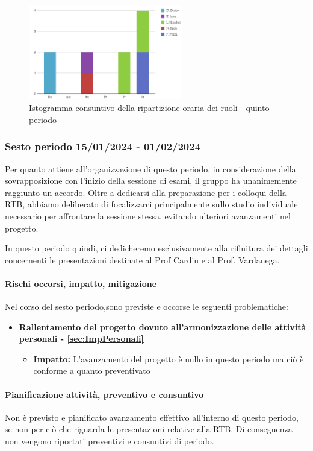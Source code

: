 \begin{figure}[H]
    \centering
    \includegraphics[width=0.6\textwidth]{../Images/consuntivoDivisioneRuoli5Periodo.png}
    \caption{Istogramma consuntivo della ripartizione oraria dei ruoli - quinto periodo}
    \label{fig:Consuntivo_ripartizione_oraria_4}
\end{figure}


\subsubsection{Sesto periodo  15/01/2024 - 01/02/2024}
Per quanto attiene all'organizzazione di questo periodo, in considerazione della sovrapposizione con l'inizio della sessione di esami, il gruppo ha unanimemente raggiunto un accordo. Oltre a dedicarsi alla preparazione per i colloqui della RTB, abbiamo deliberato di focalizzarci principalmente sullo studio individuale necessario per affrontare la sessione stessa, evitando ulteriori avanzamenti nel progetto.

In questo periodo quindi, ci dedicheremo esclusivamente alla rifinitura dei dettagli concernenti le presentazioni destinate al Prof Cardin e al Prof. Vardanega.

\paragraph{Rischi occorsi, impatto, mitigazione} 
Nel corso del sesto periodo,sono previste e occorse le seguenti problematiche:
\begin{itemize}
    \item \textbf{Rallentamento del progetto dovuto all’armonizzazione delle attività personali - \ref{sec:ImpPersonali}}
    \begin{itemize}
        \item \textbf{Impatto:}
       L'avanzamento del progetto è nullo in questo periodo ma ciò è conforme a quanto preventivato
    \end{itemize}
\end{itemize}
\newpage
\paragraph{Pianificazione attività, preventivo e consuntivo}\hspace{1pt}
Non è previsto e pianificato avanzamento effettivo all’interno di questo periodo, se non per ciò che riguarda
le presentazioni relative alla RTB.
Di conseguenza non vengono riportati preventivi e consuntivi di periodo.

